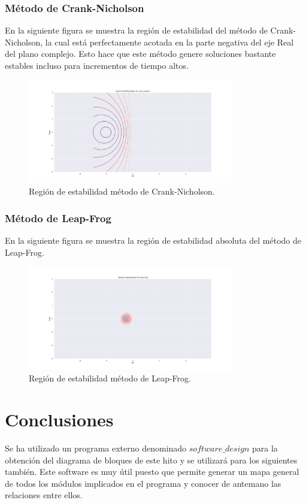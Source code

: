 \documentclass[12pt,a4paper]{article}
\begin{document}
\subsubsection{Método de Crank-Nicholson}
En la siguiente figura se muestra la región de estabilidad del método de Crank-Nicholson, la cual está perfectamente acotada en la parte negativa del eje Real del plano complejo. Esto hace que este método genere soluciones bastante estables incluso para incrementos de tiempo altos.
\begin{figure}[H]
	\centering
	\includegraphics[width=0.8\textwidth]{FIGURES/mil4/st_crank.png}
	\caption{Región de estabilidad método de Crank-Nicholson.}
	\label{st_crank}
\end{figure}


\subsubsection{Método de Leap-Frog}
En la siguiente figura se muestra la región de estabilidad absoluta del método de Leap-Frog.
\begin{figure}[H]
	\centering
	\includegraphics[width=0.8\textwidth]{FIGURES/mil4/st_leap.png}
	\caption{Región de estabilidad método de Leap-Frog.}
	\label{st_leap}
\end{figure}



\section{Conclusiones}
Se ha utilizado un programa externo denominado $software\_design$ para la obtención del diagrama de bloques de este hito y se utilizará para los siguientes también. Este software es muy útil puesto que permite generar un mapa general de todos los módulos implicados en el programa y conocer de antemano las relaciones entre ellos.
\end{document}
